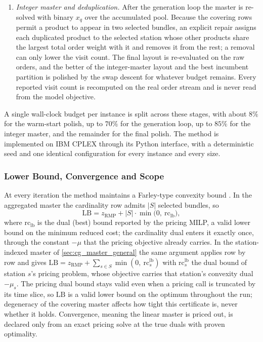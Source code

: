 \documentclass[preprint,review,11pt,authoryear]{elsarticle}
\begin{document}
\begin{enumerate}
    \item \emph{Integer master and deduplication.} After the generation loop the master is re-solved with binary $x_q$ over the accumulated pool. Because the covering rows permit a product to appear in two selected bundles, an explicit repair assigns each duplicated product to the selected station whose other products share the largest total order weight with it and removes it from the rest; a removal can only lower the visit count. The final layout is re-evaluated on the raw orders, and the better of the integer-master layout and the best incumbent partition is polished by the swap descent for whatever budget remains. Every reported visit count is recomputed on the real order stream and is never read from the model objective.
\end{enumerate}

A single wall-clock budget per instance is split across these stages, with about $8\%$ for the warm-start polish, up to $70\%$ for the generation loop, up to $85\%$ for the integer master, and the remainder for the final polish. The method is implemented on IBM CPLEX through its Python interface, with a deterministic seed and one identical configuration for every instance and every size.

\subsubsection{Lower Bound, Convergence and Scope}\label{sec:cg_bound}

At every iteration the method maintains a Farley-type convexity bound \cite{farley1990note}. In the aggregated master the cardinality row admits $|S|$ selected bundles, so
\[
\mathrm{LB} = z_{\mathrm{RMP}} + |S|\cdot \min\!\big(0,\ \mathrm{rc}_{\mathrm{lb}}\big),
\]
where $\mathrm{rc}_{\mathrm{lb}}$ is the dual (best) bound reported by the pricing MILP, a valid lower bound on the minimum reduced cost; the cardinality dual enters it exactly once, through the constant $-\mu$ that the pricing objective already carries. In the station-indexed master of \cref{sec:cg_master_general} the same argument applies row by row and gives $\mathrm{LB} = z_{\mathrm{RMP}} + \sum_{s \in S} \min(0,\ \mathrm{rc}^{\mathrm{lb}}_s)$ with $\mathrm{rc}^{\mathrm{lb}}_s$ the dual bound of station $s$'s pricing problem, whose objective carries that station's convexity dual $-\mu_s$. The pricing dual bound stays valid even when a pricing call is truncated by its time slice, so $\mathrm{LB}$ is a valid lower bound on the optimum throughout the run; degeneracy of the covering master affects how tight this certificate is, never whether it holds. Convergence, meaning the linear master is priced out, is declared only from an exact pricing solve at the true duals with proven optimality.
\end{document}
